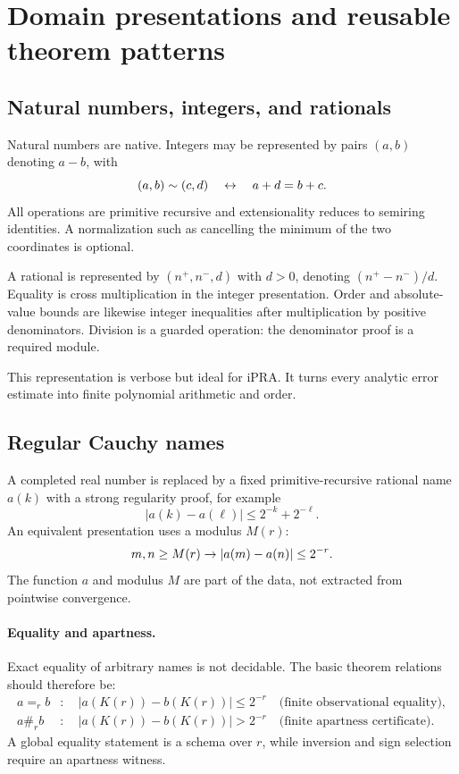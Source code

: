 
\section{Domain presentations and reusable theorem patterns}
\label{sec:quantitative}

\subsection{Natural numbers, integers, and rationals}

Natural numbers are native.  Integers may be represented by pairs
\((a,b)\) denoting \(a-b\), with
\[
  (a,b)\sim(c,d)\quad\leftrightarrow\quad a+d=b+c.
\]
All operations are primitive recursive and extensionality reduces to semiring
identities.  A normalization such as cancelling the minimum of the two
coordinates is optional.

A rational is represented by \((n^+,n^-,d)\) with \(d>0\), denoting
\((n^+-n^-)/d\).  Equality is cross multiplication in the integer
presentation.  Order and absolute-value bounds are likewise integer
inequalities after multiplication by positive denominators.  Division is a
guarded operation: the denominator proof is a required module.

This representation is verbose but ideal for iPRA.  It turns every analytic
error estimate into finite polynomial arithmetic and order.

\subsection{Regular Cauchy names}

A completed real number is replaced by a fixed primitive-recursive rational
name \(a(k)\) with a strong regularity proof, for example
\[
       |a(k)-a(\ell)|\le 2^{-k}+2^{-\ell}.
\]
An equivalent presentation uses a modulus \(M(r)\):
\[
 m,n\ge M(r)\rightarrow |a(m)-a(n)|\le2^{-r}.
\]
The function \(a\) and modulus \(M\) are part of the data, not extracted from
pointwise convergence.

\paragraph{Equality and apartness.}
Exact equality of arbitrary names is not decidable.  The basic theorem
relations should therefore be:
\[
\begin{aligned}
 a =_{\!r} b
   &:\quad |a(K(r))-b(K(r))|\le 2^{-r}
        \quad\text{(finite observational equality)},\\
 a\#_r b
   &:\quad |a(K(r))-b(K(r))|> 2^{-r}
        \quad\text{(finite apartness certificate)}.
\end{aligned}
\]
A global equality statement is a schema over \(r\), while inversion and sign
selection require an apartness witness.

